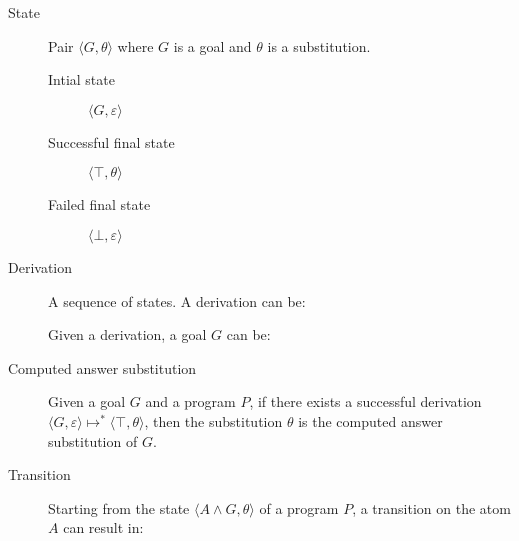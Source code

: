 \begin{description}
    \item[State] 
        Pair $\langle G, \theta \rangle$ where $G$ is a goal and $\theta$ is a substitution.
        \begin{description}
            \item[Intial state] $\langle G, \varepsilon \rangle$
            \item[Successful final state] $\langle \top, \theta \rangle$
            \item[Failed final state] $\langle \bot, \varepsilon \rangle$
        \end{description}

    \item[Derivation] 
        A sequence of states.
        A derivation can be:

        Given a derivation, a goal $G$ can be:

    \item[Computed answer substitution] 
        Given a goal $G$ and a program $P$, if there exists a successful derivation 
        $\langle G, \varepsilon \rangle \mapsto^* \langle \top, \theta \rangle$,
        then the substitution $\theta$ is the computed answer substitution of $G$.

    \item[Transition] 
        Starting from the state $\langle A \land G, \theta \rangle$ of a program $P$, a transition on the atom $A$ can result in:
\end{description}

